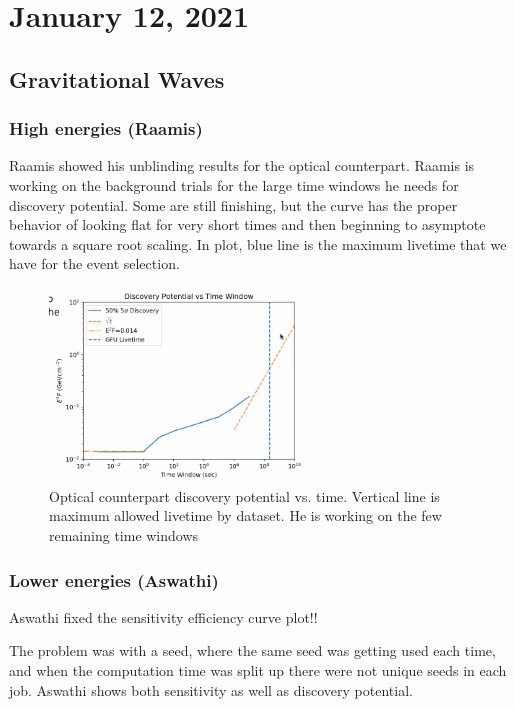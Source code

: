 \chapter{January 12, 2021}

\section{Gravitational Waves}
\subsection{High energies (Raamis)}
Raamis showed his unblinding results for the optical counterpart. Raamis is working on the background trials for the large time windows he needs for discovery potential. Some are still finishing, but the curve has the proper behavior of looking flat for very short times and then beginning to asymptote towards a square root scaling. In plot, blue line is the maximum livetime that we have for the event selection.

\begin{figure}[h]
    \centering
    \includegraphics[width=0.6\textwidth]{images/raamis_plot_011221.png}
    \caption{Optical counterpart discovery potential vs. time. Vertical line is maximum allowed livetime by dataset. He is working on the few remaining time windows}
    \label{fig:my_label}
\end{figure}

\subsection{Lower energies (Aswathi)}
Aswathi fixed the sensitivity efficiency curve plot!!

The problem was with a seed, where the same seed was getting used each time, and when the computation time was split up there were not unique seeds in each job. Aswathi shows both sensitivity as well as discovery potential. 

